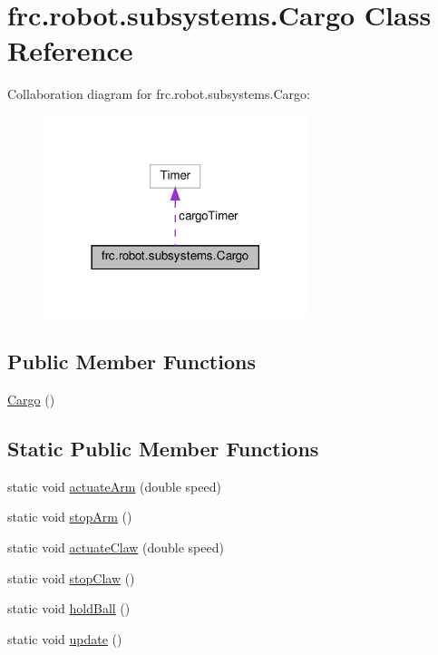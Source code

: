 \hypertarget{classfrc_1_1robot_1_1subsystems_1_1_cargo}{}\section{frc.\+robot.\+subsystems.\+Cargo Class Reference}
\label{classfrc_1_1robot_1_1subsystems_1_1_cargo}


Collaboration diagram for frc.\+robot.\+subsystems.\+Cargo\+:\nopagebreak
\begin{figure}[H]
\begin{center}
\leavevmode
\includegraphics[width=218pt]{de/d2d/classfrc_1_1robot_1_1subsystems_1_1_cargo__coll__graph}
\end{center}
\end{figure}
\subsection*{Public Member Functions}
\begin{DoxyCompactItemize}
\item 
\hyperlink{classfrc_1_1robot_1_1subsystems_1_1_cargo_ad27213bb1c8c9a33d5c2b9cc153c1508}{Cargo} ()
\end{DoxyCompactItemize}
\subsection*{Static Public Member Functions}
\begin{DoxyCompactItemize}
\item 
static void \hyperlink{classfrc_1_1robot_1_1subsystems_1_1_cargo_aa8640bc75e8b3f2472ea586936d6ed1f}{actuate\+Arm} (double speed)
\item 
static void \hyperlink{classfrc_1_1robot_1_1subsystems_1_1_cargo_aa85a0b3aa7cb498f4b1c7eac6d26bce2}{stop\+Arm} ()
\item 
static void \hyperlink{classfrc_1_1robot_1_1subsystems_1_1_cargo_aa05df516e815067a7b853d9fbdc35f01}{actuate\+Claw} (double speed)
\item 
static void \hyperlink{classfrc_1_1robot_1_1subsystems_1_1_cargo_a0ac97ff2fa2f7af96744a5dcba7ba61b}{stop\+Claw} ()
\item 
static void \hyperlink{classfrc_1_1robot_1_1subsystems_1_1_cargo_a8a4dd09c62967c4d82af8953cf8ab731}{hold\+Ball} ()
\item 
static void \hyperlink{classfrc_1_1robot_1_1subsystems_1_1_cargo_a20e8230acdc07d7d94e056f9e09d91ad}{update} ()
\end{DoxyCompactItemize}
